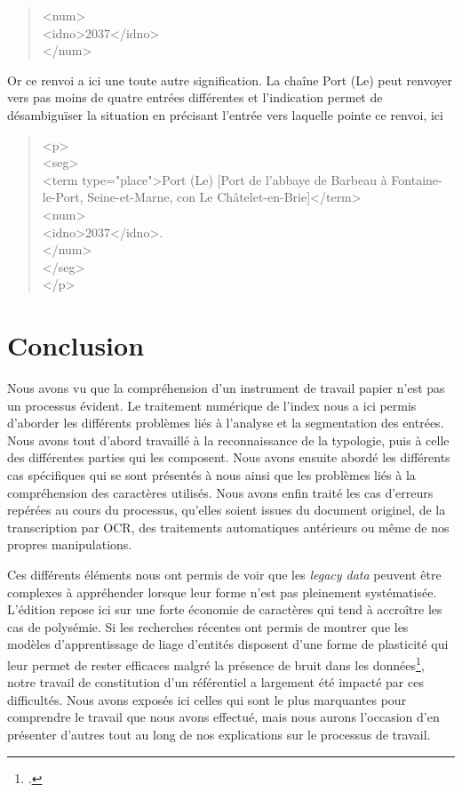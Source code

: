 \documentclass[a4paper,12pt,twoside]{book}
\begin{document}
	\begin{quotation}
		<num>\\
		\indent{}2037</idno>\\
	\end{quotation}

	\noindent Or ce renvoi a ici une toute autre signification. La chaîne \og Port (Le)\fg{} peut renvoyer vers pas moins de quatre entrées différentes et l'indication \og [2037]\fg{} permet de désambiguïser la situation en précisant l'entrée vers laquelle pointe ce renvoi, ici
	
	\begin{quotation}
            <p>\\
				\indent{}\\
				\indent\indent\indent<term type="place">Port (Le) [Port de l'abbaye de Barbeau à Fontaine-le-Port,
				Seine-et-Marne, con Le Châtelet-en-Brie]</term>\\
				\indent\indent{}\\
				\indent\indent\indent\indent<idno>2037</idno>.\\
				\indent\indent\indent</num>\\
				\indent\indent</seg>\\
				\indent</p>
	\end{quotation}
	
	\section*{Conclusion}
	
	Nous avons vu que la compréhension d'un instrument de travail papier n'est pas un processus évident. Le traitement numérique de l'index nous a ici permis d'aborder les différents problèmes liés à l'analyse et la segmentation des entrées. Nous avons tout d'abord travaillé à la reconnaissance de la typologie, puis à celle des différentes parties qui les composent. Nous avons ensuite abordé les différents cas spécifiques qui se sont présentés à nous ainsi que les problèmes liés à la compréhension des caractères utilisés. Nous avons enfin traité les cas d'erreurs repérées au cours du processus, qu'elles soient issues du document originel, de la transcription par OCR, des traitements automatiques antérieurs ou même de nos propres manipulations.
	
	Ces différents éléments nous ont permis de voir que les \textit{legacy data} peuvent être complexes à appréhender lorsque leur forme n'est pas pleinement systématisée. L'édition repose ici sur une forte économie de caractères qui tend à accroître les cas de polysémie. Si les recherches récentes ont permis de montrer que les modèles d'apprentissage de liage d'entités disposent d'une forme de plasticité qui leur permet de rester efficaces malgré la présence de bruit dans les données\footcite{linhares_pontes_impact_2019, koudoro-parfait_reconnaissance_2022}, notre travail de constitution d'un référentiel a largement été impacté par ces difficultés. Nous avons exposés ici celles qui sont le plus marquantes pour comprendre le travail que nous avons effectué, mais nous aurons l'occasion d'en présenter d'autres tout au long de nos explications sur le processus de travail.
	
\end{document}
